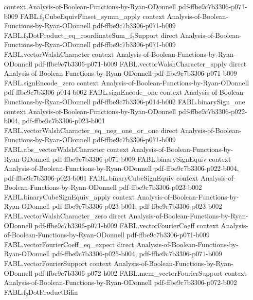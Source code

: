 \begin{theorem}
  {context}
  {Analysis-of-Boolean-Functions-by-Ryan-ODonnell}
  {pdf-ffbe9c7b3306-p071-b009}
\proofstep
  {FABL.f₂CubeEquivFinset_symm_apply}
  {context}
  {Analysis-of-Boolean-Functions-by-Ryan-ODonnell}
  {pdf-ffbe9c7b3306-p071-b009}
\proofstep
  {FABL.f₂DotProduct_eq_coordinateSum_f₂Support}
  {direct}
  {Analysis-of-Boolean-Functions-by-Ryan-ODonnell}
  {pdf-ffbe9c7b3306-p071-b009}
\proofstep
  {FABL.vectorWalshCharacter}
  {context}
  {Analysis-of-Boolean-Functions-by-Ryan-ODonnell}
  {pdf-ffbe9c7b3306-p071-b009}
\proofstep
  {FABL.vectorWalshCharacter_apply}
  {direct}
  {Analysis-of-Boolean-Functions-by-Ryan-ODonnell}
  {pdf-ffbe9c7b3306-p071-b009}
\proofstep
  {FABL.signEncode_zero}
  {context}
  {Analysis-of-Boolean-Functions-by-Ryan-ODonnell}
  {pdf-ffbe9c7b3306-p014-b002}
\proofstep
  {FABL.signEncode_one}
  {context}
  {Analysis-of-Boolean-Functions-by-Ryan-ODonnell}
  {pdf-ffbe9c7b3306-p014-b002}
\proofstep
  {FABL.binarySign_one}
  {context}
  {Analysis-of-Boolean-Functions-by-Ryan-ODonnell}
  {pdf-ffbe9c7b3306-p022-b004,
    pdf-ffbe9c7b3306-p023-b001}
\proofstep
  {FABL.vectorWalshCharacter_eq_neg_one_or_one}
  {direct}
  {Analysis-of-Boolean-Functions-by-Ryan-ODonnell}
  {pdf-ffbe9c7b3306-p071-b009}
\proofstep
  {FABL.abs_vectorWalshCharacter}
  {context}
  {Analysis-of-Boolean-Functions-by-Ryan-ODonnell}
  {pdf-ffbe9c7b3306-p071-b009}
\proofstep
  {FABL.binarySignEquiv}
  {context}
  {Analysis-of-Boolean-Functions-by-Ryan-ODonnell}
  {pdf-ffbe9c7b3306-p022-b004,
    pdf-ffbe9c7b3306-p023-b001}
\proofstep
  {FABL.binaryCubeSignEquiv}
  {context}
  {Analysis-of-Boolean-Functions-by-Ryan-ODonnell}
  {pdf-ffbe9c7b3306-p023-b002}
\proofstep
  {FABL.binaryCubeSignEquiv_apply}
  {context}
  {Analysis-of-Boolean-Functions-by-Ryan-ODonnell}
  {pdf-ffbe9c7b3306-p023-b001,
    pdf-ffbe9c7b3306-p023-b002}
\proofstep
  {FABL.vectorWalshCharacter_zero}
  {direct}
  {Analysis-of-Boolean-Functions-by-Ryan-ODonnell}
  {pdf-ffbe9c7b3306-p071-b009}
\proofstep
  {FABL.vectorFourierCoeff}
  {context}
  {Analysis-of-Boolean-Functions-by-Ryan-ODonnell}
  {pdf-ffbe9c7b3306-p071-b009}
\proofstep
  {FABL.vectorFourierCoeff_eq_expect}
  {direct}
  {Analysis-of-Boolean-Functions-by-Ryan-ODonnell}
  {pdf-ffbe9c7b3306-p025-b004,
    pdf-ffbe9c7b3306-p071-b009}
\proofstep
  {FABL.vectorFourierSupport}
  {context}
  {Analysis-of-Boolean-Functions-by-Ryan-ODonnell}
  {pdf-ffbe9c7b3306-p072-b002}
\proofstep
  {FABL.mem_vectorFourierSupport}
  {context}
  {Analysis-of-Boolean-Functions-by-Ryan-ODonnell}
  {pdf-ffbe9c7b3306-p072-b002}
\proofstep
  {FABL.f₂DotProductBilin}

\end{theorem}
